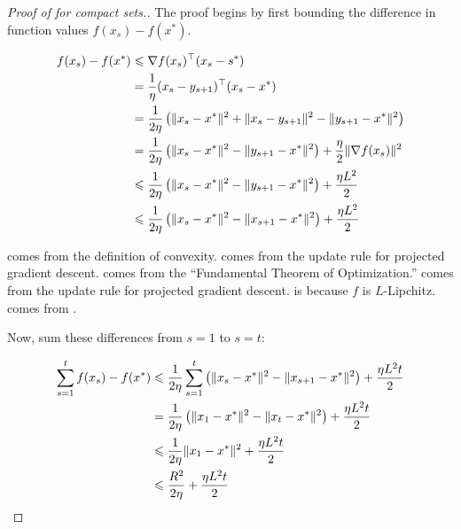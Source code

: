 \begin{proof}[Proof of  for compact sets.]

The proof begins by first bounding the difference in function values $f(x_s) -
f(x^*)$.

\begin{align}
    f(x_s) - f(x^*) &\leq \nabla f(x_s)^\trans (x_s - s^*) \equationlabel{a} \\
    &= \frac{1}{\eta}(x_s - y_{s+1})^\trans(x_s - x^*) \equationlabel{b} \\
    &= \frac{1}{2\eta} \left(\lVert x_s - x^* \rVert^2 + \lVert x_s - y_{s+1} \rVert^2 - \lVert y_{s+1} - x^* \rVert^2 \right) \equationlabel{c} \\
    &= \frac{1}{2\eta} \left(\lVert x_s - x^* \rVert^2 - \lVert y_{s+1} - x^* \rVert^2 \right) + \frac{\eta}{2} \lVert \nabla f(x_s) \rVert^2 \equationlabel{d} \\
    &\leq \frac{1}{2\eta} \left(\lVert x_s - x^* \rVert^2 - \lVert y_{s+1} - x^* \rVert^2 \right) + \frac{\eta L^2}{2} \equationlabel{e} \\
    &\leq \frac{1}{2\eta} \left(\lVert x_s - x^* \rVert^2 - \lVert x_{s+1} - x^* \rVert^2 \right) + \frac{\eta L^2}{2} \equationlabel{f}
\end{align}

 comes from the definition of convexity.  comes
from the update rule for projected gradient descent.  comes from
the ``Fundamental Theorem of Optimization.''  comes from the
update rule for projected gradient descent.  is because $f$ is
$L$-Lipchitz. 
comes from .

Now, sum these differences from $s=1$ to $s=t$:

\begin{align}
   \sum_{s=1}^t f(x_s) - f(x^*) &\leq  \frac{1}{2\eta} \sum_{s=1}^t \left(\lVert x_s - x^* \rVert^2 - \lVert x_{s+1} - x^* \rVert^2 \right) + \frac{\eta L^2 t}{2} \equationlabel{g} \\
   &= \frac{1}{2\eta} \left(\lVert x_1 - x^* \rVert^2 - \lVert x_{t} - x^{*} \rVert^2 \right) + \frac{\eta L^2 t}{2} \equationlabel{h} \\
   &\leq \frac{1}{2\eta} \lVert x_1 - x^* \rVert^2 + \frac{\eta L^2 t}{2} \equationlabel{i} \\
   &\leq \frac{R^2}{2\eta} + \frac{\eta L^2 t}{2} \equationlabel{j}
\end{align}


\end{proof}
